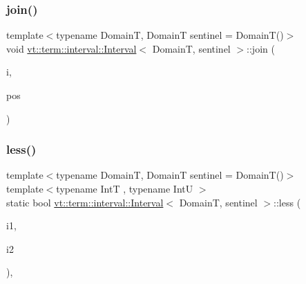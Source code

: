 \subsubsection{\texorpdfstring{join()}{join()}}
{\footnotesize\ttfamily template$<$typename DomainT, DomainT sentinel = Domain\+T()$>$ \\
void \hyperlink{structvt_1_1term_1_1interval_1_1_interval}{vt\+::term\+::interval\+::\+Interval}$<$ DomainT, sentinel $>$\+::join (\begin{DoxyParamCaption}\item[{\hyperlink{structvt_1_1term_1_1interval_1_1_interval_a183b53c7344a9aa51c026dfe71b57ad4}{Interval\+Type} const \&}]{i,  }\item[{\hyperlink{structvt_1_1term_1_1interval_1_1_interval_adfdde0c1b12f536189432b168f6df6b3}{Position\+Enum}}]{pos }\end{DoxyParamCaption})\hspace{0.3cm}{\ttfamily [inline]}}

\mbox{\label{structvt_1_1term_1_1interval_1_1_interval_aeceb02f8e69baada4cc1d47bdefc851f}} 
\subsubsection{\texorpdfstring{less()}{less()}}
{\footnotesize\ttfamily template$<$typename DomainT, DomainT sentinel = Domain\+T()$>$ \\
template$<$typename IntT , typename IntU $>$ \\
static bool \hyperlink{structvt_1_1term_1_1interval_1_1_interval}{vt\+::term\+::interval\+::\+Interval}$<$ DomainT, sentinel $>$\+::less (\begin{DoxyParamCaption}\item[{IntT \&\&}]{i1,  }\item[{IntU \&\&}]{i2 }\end{DoxyParamCaption})\hspace{0.3cm}{\ttfamily [inline]}, {\ttfamily [static]}}

\mbox{\label{structvt_1_1term_1_1interval_1_1_interval_a36da58c3174932da9889d973c2940789}} 
